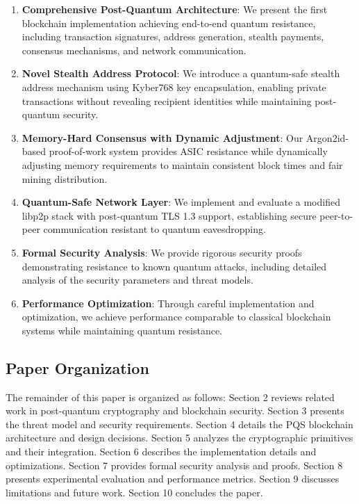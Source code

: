 \documentclass[12pt,a4paper]{article}
\begin{document}
\begin{enumerate}
\item \textbf{Comprehensive Post-Quantum Architecture}: We present the first blockchain implementation achieving end-to-end quantum resistance, including transaction signatures, address generation, stealth payments, consensus mechanisms, and network communication.

\item \textbf{Novel Stealth Address Protocol}: We introduce a quantum-safe stealth address mechanism using Kyber768 key encapsulation, enabling private transactions without revealing recipient identities while maintaining post-quantum security.

\item \textbf{Memory-Hard Consensus with Dynamic Adjustment}: Our Argon2id-based proof-of-work system provides ASIC resistance while dynamically adjusting memory requirements to maintain consistent block times and fair mining distribution.

\item \textbf{Quantum-Safe Network Layer}: We implement and evaluate a modified libp2p stack with post-quantum TLS 1.3 support, establishing secure peer-to-peer communication resistant to quantum eavesdropping.

\item \textbf{Formal Security Analysis}: We provide rigorous security proofs demonstrating resistance to known quantum attacks, including detailed analysis of the security parameters and threat models.

\item \textbf{Performance Optimization}: Through careful implementation and optimization, we achieve performance comparable to classical blockchain systems while maintaining quantum resistance.
\end{enumerate}

\subsection{Paper Organization}

The remainder of this paper is organized as follows: Section 2 reviews related work in post-quantum cryptography and blockchain security. Section 3 presents the threat model and security requirements. Section 4 details the PQS blockchain architecture and design decisions. Section 5 analyzes the cryptographic primitives and their integration. Section 6 describes the implementation details and optimizations. Section 7 provides formal security analysis and proofs. Section 8 presents experimental evaluation and performance metrics. Section 9 discusses limitations and future work. Section 10 concludes the paper.
\end{document}
